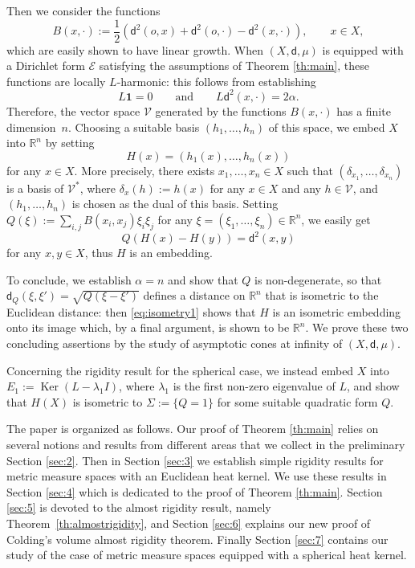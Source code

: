 \documentclass[JEP,XML,SOM,Unicode,published]{cedram}
\DeclareMathOperator{\Ker}{Ker}
\theoremstyle{plain}
\theoremstyle{definition}
\newcommand{\setR}{\mathbb{R}}
\newcommand{\cE}{\mathcal{E}}
\newcommand{\cV}{\mathcal{V}}
\newcommand{\dist}{\mathsf{d}}
\begin{document}
Then we consider the functions
\[
B(x,\cdot):=\frac{1}{2}(\dist^2(o,x)+\dist^2(o,\cdot)-\dist^2(x,\cdot)), \qquad x \in X,
\]
which are easily shown to have linear growth. When $(X,\dist,\mu)$ is equipped with a Dirichlet form $\cE$ satisfying the assumptions of Theorem \ref{th:main}, these functions are locally $L$-harmonic: this follows from establishing
\[
L\textbf{1}=0 \qquad \text{and} \qquad L\dist^2(x,\cdot) = 2 \alpha.
\]
Therefore, the vector space $\cV$ generated by the functions $B(x,\cdot)$ has a finite dimension~$n$. Choosing a suitable basis $(h_1,\ldots,h_n)$ of this space, we embed $X$ into $\setR^n$ by setting
\[
H(x)=(h_1(x),\ldots,h_n(x))
\]
for any $x \in X$. More precisely, there exists $x_1,\ldots,x_n \in X$ such that $(\delta_{x_1},\ldots,\delta_{x_n})$ is a basis of $\cV^{*}$, where $\delta_{x}(h):=h(x)$ for any $x \in X$ and any $h \in \cV$, and $(h_1,\ldots,h_n)$ is chosen as the dual of this basis. Setting $Q(\xi):= \sum_{i,j} B(x_i,x_j)\xi_i \xi_j$ for any $\xi=(\xi_1,\dots,\xi_n) \in \setR^n$, we easily get
\begin{equation}\label{eq:isometry1}
Q(H(x)-H(y))=\dist^2(x,y)
\end{equation}
for any $x, y \in X$, thus $H$ is an embedding.

To conclude, we establish $\alpha = n$ and show that $Q$ is non-degenerate, so that $\dist_Q(\xi,\xi')=\sqrt{Q(\xi-\xi')}$ defines a distance on $\setR^n$ that is isometric to the Euclidean distance: then \eqref{eq:isometry1} shows that $H$ is an isometric embedding onto its image which, by a final argument, is shown to be $\setR^n$. We prove these two concluding assertions by the study of asymptotic cones at infinity of $(X,\dist,\mu)$.

Concerning the rigidity result for the spherical case, we instead embed $X$ into $E_1:=\Ker(L-\lambda_1 I)$, where $\lambda_1$ is the first non-zero eigenvalue of $L$, and show that $H(X)$ is isometric to $\Sigma:=\{Q=1\}$ for some suitable quadratic form $Q$.

The paper is organized as follows. Our proof of Theorem \ref{th:main} relies on several notions and results from different areas that we collect in the preliminary Section \ref{sec:2}. Then in Section \ref{sec:3} we establish simple rigidity results for metric measure spaces with an Euclidean heat kernel. We use these results in Section \ref{sec:4} which is dedicated to the proof of Theorem \ref{th:main}. Section \ref{sec:5} is devoted to the almost rigidity result, namely Theorem~\ref{th:almostrigidity}, and Section \ref{sec:6} explains our new proof of Colding's volume almost rigidity theorem. Finally Section \ref{sec:7} contains our study of the case of metric measure spaces equipped with a spherical heat kernel.
\end{document}
